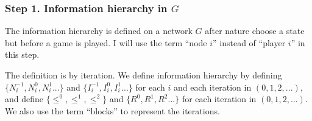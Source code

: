 \documentclass[12pt,letter]{article}
\theoremstyle{definition}
\theoremstyle{remark}
\theoremstyle{claim}
\begin{document}
\subsubsection{Step 1. Information hierarchy in $G$}

The information hierarchy is defined on a network $G$ after nature choose a state but before a game is played. I will use the term ``node $i$'' instead of ``player $i$'' in this step.

The definition is by iteration. We define information hierarchy by defining $\{N^{-1}_i,N^{0}_i, N^{1}_i...\}$ and $\{I^{-1}_i,I^{0}_i, I^{1}_i...\}$ for each $i$ and each iteration in $(0,1,2,...)$, and define $\{\leq^0, \leq^1, \leq^2\}$ and $\{R^0,R^{1}, R^{2}...\}$ for each iteration in $(0,1,2,...)$. We also use the term ``blocks'' to represent the iterations.
\end{document}
